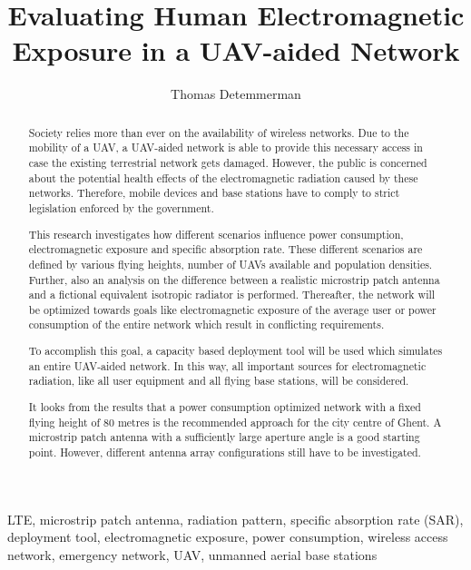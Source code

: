\documentclass[twocolumn]{phdsymp} %
\begin{document}
\title{Evaluating Human Electromagnetic Exposure in a \gls{UAV}-aided Network}

\author{Thomas Detemmerman}


\maketitle

\begin{abstract}
Society relies more than ever on the availability of wireless networks.
Due to the mobility of a UAV, a UAV-aided network is able to provide this necessary access in case the existing terrestrial network gets damaged.
However,  the public is 
concerned about the potential health effects of the electromagnetic radiation caused by these networks.
Therefore, mobile devices and base stations have to comply to strict legislation enforced by the government.

This research investigates how different scenarios influence power consumption, electromagnetic exposure and specific absorption rate.
These different scenarios are defined by various flying heights, number of UAVs available and population densities. Further, also 
an analysis on the difference
between a realistic microstrip patch antenna and a fictional equivalent isotropic radiator is performed.
Thereafter, the network will be optimized towards goals like electromagnetic exposure of the average user or 
power consumption of the entire network which result in conflicting requirements.

To accomplish this goal, a capacity based deployment tool will be used which simulates an entire UAV-aided network.
In this way, all important sources for electromagnetic radiation, like all user equipment and all flying base stations, 
will be considered.

It looks from the results that a power consumption optimized network with a fixed flying height of 80 metres is the recommended approach
for the city centre of Ghent.
A microstrip patch 
antenna with a sufficiently large aperture angle is a good starting point. However, different antenna array configurations still have to 
be investigated.
\end{abstract}

\begin{keywords}
LTE, microstrip patch antenna, radiation pattern, specific absorption rate (SAR),
deployment tool, electromagnetic exposure, power consumption, wireless access network, 
emergency network, UAV, unmanned aerial base stations
\end{keywords}
\end{document}
